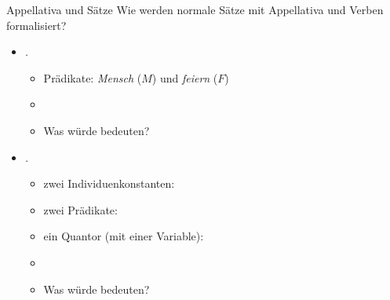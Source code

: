 \begin{frame}
  {Appellativa und Sätze}
  \onslide<+->
  \onslide<+->
  Wie werden normale Sätze mit Appellativa und Verben formalisiert?\\
  \Halbzeile
  \begin{itemize}[<+->]
    \item \textit{  .}
      \begin{itemize}[<+->]
        \item {} Prädikate: \textit{Mensch} ($M$) und \textit{feiern} ($F$)
        \item {}
        \item<10-> Was würde  bedeuten?
      \end{itemize}
      \Halbzeile
    \item<11-> \textit{    .}
      \begin{itemize}[<+->]
        \item<12-> zwei Individuenkonstanten:  
        \item<15-> zwei Prädikate: 
        \item<18-> ein Quantor (mit einer Variable): 
      \item<20-> 
      \item<26-> Was würde  bedeuten?
      \end{itemize}
  \end{itemize}
\end{frame}

